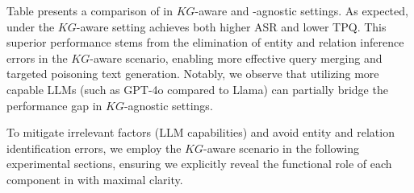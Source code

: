\begin{table}[!ht]\footnotesize
  \def\arraystretch{1.2}
  \setlength{\tabcolsep}{2pt}  %
  \caption{\small Impact of knowledge graph awareness.}
  \begin{center}
  \end{center}
\label{tbl:kgaware}
\end{table}
Table presents a comparison of \attack in $KG$-aware and -agnostic settings. As expected, \attack under the $KG$-aware setting achieves both higher ASR and lower TPQ. This superior performance stems from the elimination of entity and relation inference errors in the $KG$-aware scenario, enabling more effective query merging and targeted poisoning text generation. Notably, we observe that utilizing more capable LLMs (such as GPT-4o compared to Llama) can partially bridge the performance gap in $KG$-agnostic settings. 

To mitigate irrelevant factors (\meg LLM capabilities) and avoid entity and relation identification errors, we employ the $KG$-aware scenario in the following experimental sections, ensuring we explicitly reveal the functional role of each component in \attack with maximal clarity.


